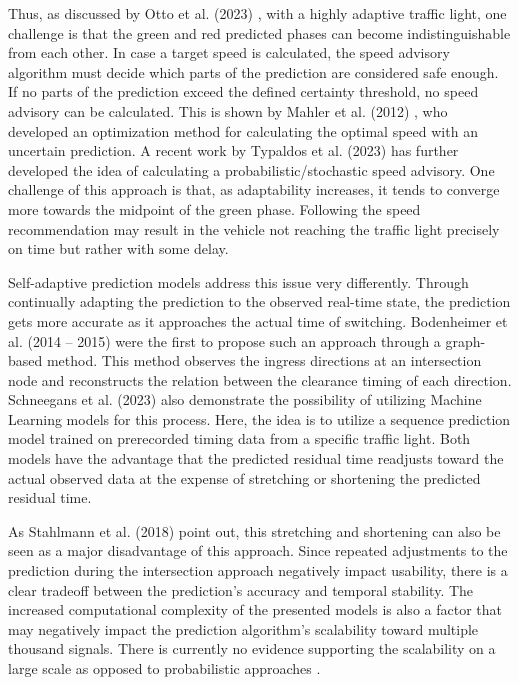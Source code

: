 Thus, as discussed by Otto et al. (2023) \cite{otto_framework_2023}, with a highly adaptive traffic light, one challenge is that the green and red predicted phases can become indistinguishable from each other. In case a target speed is calculated, the speed advisory algorithm must decide which parts of the prediction are considered safe enough. If no parts of the prediction exceed the defined certainty threshold, no speed advisory can be calculated. This is shown by Mahler et al. (2012) \cite{mahler_reducing_2012}, who developed an optimization method for calculating the optimal speed with an uncertain prediction. A recent work by Typaldos et al. (2023) \cite{typaldos_modified_2023} has further developed the idea of calculating a probabilistic/stochastic speed advisory. One challenge of this approach is that, as adaptability increases, it tends to converge more towards the midpoint of the green phase. Following the speed recommendation may result in the vehicle not reaching the traffic light precisely on time but rather with some delay.

Self-adaptive prediction models address this issue very differently. Through continually adapting the prediction to the observed real-time state, the prediction gets more accurate as it approaches the actual time of switching. Bodenheimer et al. (2014 -- 2015) \cite{bodenheimer_enabling_2014, bodenheimer_glosa_2015} were the first to propose such an approach through a graph-based method. This method observes the ingress directions at an intersection node and reconstructs the relation between the clearance timing of each direction. Schneegans et al. (2023) \cite{schneegans_prediction_2023} also demonstrate the possibility of utilizing Machine Learning models for this process. Here, the idea is to utilize a sequence prediction model trained on prerecorded timing data from a specific traffic light. Both models have the advantage that the predicted residual time readjusts toward the actual observed data at the expense of stretching or shortening the predicted residual time.

As Stahlmann et al. (2018) \cite{stahlmann_exploring_2018} point out, this stretching and shortening can also be seen as a major disadvantage of this approach. Since repeated adjustments to the prediction during the intersection approach negatively impact usability, there is a clear tradeoff between the prediction's accuracy and temporal stability. The increased computational complexity of the presented models is also a factor that may negatively impact the prediction algorithm's scalability toward multiple thousand signals. There is currently no evidence supporting the scalability on a large scale as opposed to probabilistic approaches \cite{protschky_extensive_2014, protschky_adaptive_2014}. 

